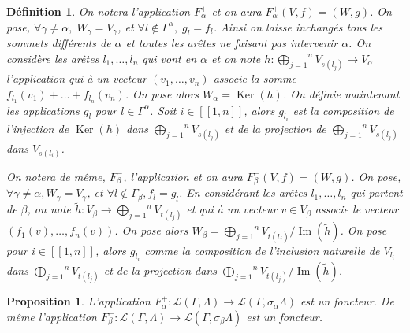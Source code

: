 \documentclass[a4paper,10pt]{article}
\newtheorem{defi}{Définition}[section]
\newtheorem{prop}{Proposition}[section]
\DeclareMathOperator{\Ker}{Ker}
\DeclareMathOperator{\Img}{Im}
\begin{document}
\begin{defi}
	On notera l'application $F_{\alpha}^{+}$ et on aura $F_{\alpha}^{+}(V,f)=(W,g)$. On pose, $\forall \gamma\neq\alpha,\;W_{\gamma}=V_{\gamma}$, et $\forall l \notin \Gamma^{\alpha},\; g_{l}=f_{l}$. Ainsi on laisse inchangés tous les sommets différents de $\alpha$ et toutes les arêtes ne faisant pas intervenir $\alpha$. On considère les arêtes $l_{1},\dots,l_{n}$ qui vont en $\alpha$ et on note $h:\overset{n}{\underset{j=1}{\bigoplus}}V_{s(l_{j})}\rightarrow V_{\alpha}$ l'application qui à un vecteur $(v_{1},\dots,v_{n})$ associe la somme $f_{l_{1}}(v_{1})+\dots+f_{l_{n}}(v_{n})$. On pose alors $W_{\alpha}=\Ker(h)$. On définie maintenant les applications $g_{l}$ pour $l\in\Gamma^{\alpha}$. Soit $i\in[\![1,n]\!]$, alors $g_{l_{i}}$ est la composition de l'injection de $\Ker(h)$ dans $\overset{n}{\underset{j=1}{\bigoplus}}V_{s(l_{j})}$ et de la projection de $\overset{n}{\underset{j=1}{\bigoplus}}V_{s(l_{j})}$ dans $V_{s(l_{i})}$. 

	On notera de même, $F^{-}_{\beta}$, l'application et on aura $F^{-}_{\beta}(V,f) = (W,g)$. On pose, $\forall \gamma \neq \alpha, W_\gamma = V_\gamma$, et $\forall l \notin \Gamma_\beta, f_l = g_l$. En considérant les arêtes $l_1, \dots, l_n$ qui partent de $\beta$, on note $\tilde{h} : V_\beta \rightarrow \overset{n}{\underset{j=1}{\bigoplus}}V_{t(l_{j})}$ et qui à un vecteur $v \in V_\beta$ associe le vecteur $(f_1(v),\dots, f_n(v))$. On pose alors $W_\beta = \overset{n}{\underset{j=1}{\bigoplus}}V_{t(l_{j})}/\Img(\tilde{h})$. On pose pour $i\in [\![1,n]\!]$, alors $g_{l_i}$ comme la composition de l'inclusion naturelle de $V_{l_i}$ dans $\overset{n}{\underset{j=1}{\bigoplus}}V_{t(l_{j})}$ et de la projection dans $\overset{n}{\underset{j=1}{\bigoplus}}V_{t(l_{j})}/\Img(\tilde h)$.

\end{defi}

\begin{prop}
	L'application $F_{\alpha}^{+}:\mathscr{L}(\Gamma,\Lambda)\rightarrow\mathscr{L}(\Gamma,\sigma_{\alpha}\Lambda)$ est un foncteur. De même l'application $F_{\beta}^{-}:\mathscr{L}(\Gamma,\Lambda)\rightarrow\mathscr{L}(\Gamma,\sigma_{\beta}\Lambda)$ est un foncteur.
\end{prop}
\end{document}

